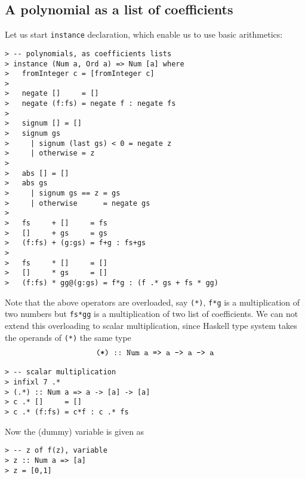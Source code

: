 \documentclass[11pt]{book}
\begin{document}
\subsection{A polynomial as a list of coefficients}
Let us start \texttt{instance} declaration, which enable us to use basic arithmetics:
\begin{verbatim}
> -- polynomials, as coefficients lists
> instance (Num a, Ord a) => Num [a] where
>   fromInteger c = [fromInteger c] 
> 
>   negate []     = []
>   negate (f:fs) = negate f : negate fs
> 
>   signum [] = []
>   signum gs 
>     | signum (last gs) < 0 = negate z
>     | otherwise = z
> 
>   abs [] = []
>   abs gs 
>     | signum gs == z = gs
>     | otherwise      = negate gs
> 
>   fs     + []     = fs
>   []     + gs     = gs
>   (f:fs) + (g:gs) = f+g : fs+gs
> 
>   fs     * []     = []
>   []     * gs     = []
>   (f:fs) * gg@(g:gs) = f*g : (f .* gs + fs * gg)
\end{verbatim}
Note that the above operators are overloaded, say \texttt{(*)}, \texttt{f*g} is a multiplication of two numbers but \texttt{fs*gg} is a multiplication of two list of coefficients.
We can not extend this overloading to scalar multiplication, since Haskell type system takes the operands of \texttt{(*)} the same type
\begin{eqnarray}
\verb+(*) :: Num a => a -> a -> a+
\end{eqnarray}

\begin{verbatim}
> -- scalar multiplication
> infixl 7 .*
> (.*) :: Num a => a -> [a] -> [a]
> c .* []     = []
> c .* (f:fs) = c*f : c .* fs
\end{verbatim}
Now the (dummy) variable is given as 
\begin{verbatim}
> -- z of f(z), variable
> z :: Num a => [a]
> z = [0,1]
\end{verbatim}
\end{document}
